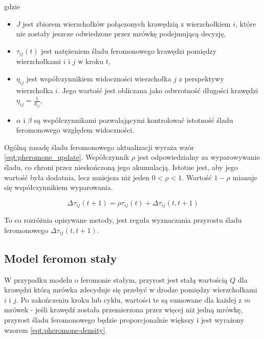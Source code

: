 {{        gdzie
        \begin{itemize}
            \item $J$ jest zbiorem wierzchołków połączonych krawędzią z wierzchołkiem $i$, które nie zostały jeszcze
            odwiedzone przez mrówkę podejmującą decyzję,
            \item $\tau_{ij}(t)$ jest natężeniem śladu feromonowego krawędzi pomiędzy wierzchołkami $i$ i $j$ w kroku
            $t$,
            \item $\eta_{ij}$ jest współczynnikiem widoczności wierzchołka $j$ z perspektywy wierzchołka $i$. Jego
            wartość jest obliczana jako odwrotność długości krawędzi $\eta_{ij} = \frac{1}{d_{ij}}$,
            \item $\alpha$ i $\beta$ są współczynnikami pozwalającymi kontrolować istotność śladu feromonowego względem
            widoczności.
        \end{itemize}

        Ogólną zasadę śladu feromonowego aktualizacji wyraża wzór \ref{eqt:pheromone_update}. Współczynnik $\rho$ jest
        odpowiedzialny za wyparowywanie śladu, co chroni przez nieskończoną jego akumulacją. Istotne jest, aby jego
        wartość była dodatnia, lecz mniejsza niż jeden $0 < \rho < 1$. Wartość $1 - \rho$ mianuje się współczynnikiem
        wyparowania.

        \begin{equation}\label{eqt:pheromone_update}
            \Delta\tau_{ij}(t + 1) = \rho\tau_{ij}(t) + \Delta\tau_{ij}(t, t + 1)
        \end{equation}

        To co rozróżnia opisywane metody, jest reguła wyznaczania przyrostu śladu feromonowego $\Delta\tau_{ij}(t, t +
        1)$.

        \subsection{Model feromon stały}
        {
            W przypadku modelu o feromonie stałym, przyrost jest stałą wartością $Q$ dla krawędzi którą mrówka zdecyduje
            się przebyć w drodze pomiędzy wierzchołkami $i$ i $j$. Po zakończeniu kroku lub cyklu, wartości te są
            sumowane dla każdej z $m$ mrówek - jeśli krawędź została przemierzona przez więcej niż jedną mrówkę,
            przyrost śladu feromonowego będzie proporcjonalnie większy i jest wyrażony wzorem
            \ref{eqt:pheromone-density}.

}}}
